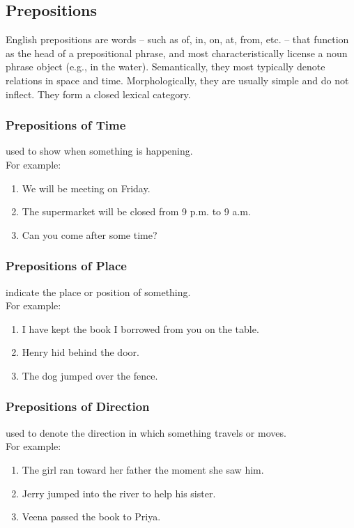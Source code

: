 \subsection{Prepositions \cite{wiki-English_prepositions}}
English prepositions are words – such as of, in, on, at, from, etc. – that function as the head of a prepositional phrase, and most characteristically license a noun phrase object (e.g., in the water). Semantically, they most typically denote relations in space and time. Morphologically, they are usually simple and do not inflect. They form a closed lexical category.

\subsubsection{Prepositions of Time \cite{byjus-english-prepositions}}
used to show when something is happening.\\
For example:
\begin{enumerate}
    \item We will be meeting on Friday.
    \item The supermarket will be closed from 9 p.m. to 9 a.m.
    \item Can you come after some time?
\end{enumerate}


\subsubsection{Prepositions of Place \cite{byjus-english-prepositions}}
indicate the place or position of something. \\
For example:
\begin{enumerate}
    \item I have kept the book I borrowed from you on the table.
    \item Henry hid behind the door.
    \item The dog jumped over the fence.
\end{enumerate}

\subsubsection{Prepositions of Direction \cite{byjus-english-prepositions}}
used to denote the direction in which something travels or moves.\\
For example:
\begin{enumerate}
    \item The girl ran toward her father the moment she saw him.
    \item Jerry jumped into the river to help his sister.
    \item Veena passed the book to Priya.
\end{enumerate}

